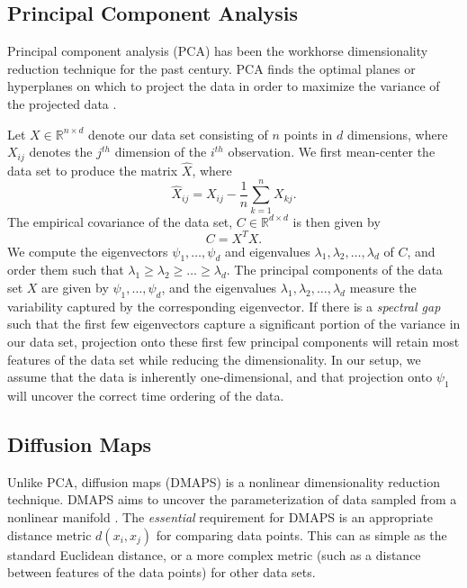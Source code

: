 \documentclass[10pt]{article}
\begin{document}
\subsection*{Principal Component Analysis}
Principal component analysis (PCA) has been the workhorse dimensionality reduction technique for the past century.
%
PCA finds the optimal planes or hyperplanes on which to project the data in order to maximize the variance of the projected data \cite{shlens2005tutorial}.

Let $X \in \mathbb{R}^{n \times d}$ denote our data set consisting of $n$ points in $d$ dimensions, where $X_{ij}$ denotes the $j^{th}$ dimension of the $i^{th}$ observation. 
%
We first mean-center the data set to produce the matrix $\hat{X}$, where
\begin{equation}
\hat{X}_{ij} = X_{ij} - \frac{1}{n} \sum_{k=1}^n X_{kj}.
\end{equation}
%
The empirical covariance of the data set, $C \in \mathbb{R}^{d \times d}$ is then given by
\begin{equation}
C = X^T X.
\end{equation}
%
We compute the eigenvectors $\psi_1, \dots, \psi_d$ and eigenvalues $\lambda_1, \lambda_2, \dots, \lambda_d$ of $C$, and order them such that $\lambda_1 \ge \lambda_2 \ge \dots \ge \lambda_d$.
%
The principal components of the data set $X$ are given by $\psi_1, \dots, \psi_d$, and the eigenvalues $\lambda_1, \lambda_2, \dots, \lambda_d$ measure the variability captured by the corresponding eigenvector. 
%
If there is a {\em spectral gap} such that the first few eigenvectors capture a significant portion of the variance in our data set, projection onto these first few principal components will retain most features of the data set while reducing the dimensionality.
%
In our setup, we assume that the data is inherently one-dimensional, and that projection onto $\psi_1$ will uncover the correct time ordering of the data.

\subsection*{Diffusion Maps}
Unlike PCA, diffusion maps (DMAPS) is a nonlinear dimensionality reduction technique. 
%
DMAPS aims to uncover the parameterization of data sampled from a nonlinear manifold \cite{coifman2005geometric}.
%
The {\em essential} requirement for DMAPS is an appropriate distance metric $d(x_i, x_j)$ for comparing data points. 
%
This can as simple as the standard Euclidean distance, or a more complex metric (such as a distance between features of the data points) for other data sets.
\end{document}
